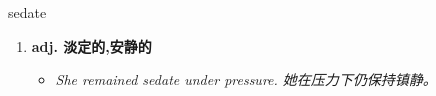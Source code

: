 
\begin{frame}
{\huge sedate}
\begin{center}
\begin{enumerate}\Large
  \item \textbf{adj. 淡定的,安静的}
  \begin{itemize}
    \item \em{\Large{She remained sedate under pressure. 她在压力下仍保持镇静。}}
  \end{itemize}
\end{enumerate}
\end{center}
\end{frame}
